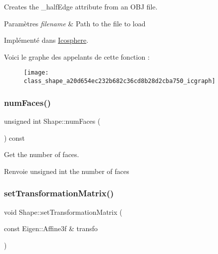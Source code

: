 Creates the \+\_\+half\+Edge attribute from an O\+BJ file. 


\begin{DoxyParams}{Paramètres}
{\em filename} & Path to the file to load \\
\hline
\end{DoxyParams}


Implémenté dans \hyperlink{class_icosphere_a72c3cc3d95cf508a623fe336cbbab350}{Icosphere}.

Voici le graphe des appelants de cette fonction \+:\nopagebreak
\begin{figure}[H]
\begin{center}
\leavevmode
\texttt{[image: class\_shape\_a20d654ec232b682c36cd8b28d2cba750\_icgraph]}
\end{center}
\end{figure}
\mbox{\label{class_shape_a13b8454d5ba906f0c99da162d7c14eab}} 
\subsubsection{\texorpdfstring{num\+Faces()}{numFaces()}}
{\footnotesize\ttfamily unsigned int Shape\+::num\+Faces (\begin{DoxyParamCaption}{ }\end{DoxyParamCaption}) const\hspace{0.3cm}{\ttfamily [inline]}}



Get the number of faces. 

\begin{DoxyReturn}{Renvoie}
unsigned int the number of faces 
\end{DoxyReturn}
\mbox{\label{class_shape_a04294d1d80623bb8c5a7d4037549fa27}} 
\subsubsection{\texorpdfstring{set\+Transformation\+Matrix()}{setTransformationMatrix()}}
{\footnotesize\ttfamily void Shape\+::set\+Transformation\+Matrix (\begin{DoxyParamCaption}\item[{const Eigen\+::\+Affine3f \&}]{transfo }\end{DoxyParamCaption})\hspace{0.3cm}{\ttfamily [inline]}}



